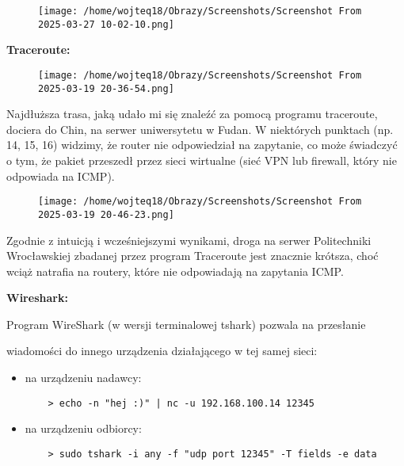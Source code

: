\documentclass[12pt]{article}
\begin{document}
\begin{figure}[H]
  \hspace{-4cm}
  \texttt{[image: /home/wojteq18/Obrazy/Screenshots/Screenshot From 2025-03-27 10-02-10.png]}
  \label{fig:large_hu_berlin}
\end{figure}


\vspace{1\baselineskip}
\textbf{Traceroute:}

\begin{figure}[H]
  \centering
  \texttt{[image: /home/wojteq18/Obrazy/Screenshots/Screenshot From 2025-03-19 20-36-54.png]}
  \label{fig:traceroute_china}
\end{figure}

Najdłuższa trasa, jaką udało mi się znaleźć za pomocą programu traceroute, dociera do Chin, na serwer uniwersytetu w Fudan. 
W niektórych punktach (np. 14, 15, 16) widzimy, że router nie odpowiedział na zapytanie, co może świadczyć o tym, że pakiet przeszedł przez sieci wirtualne
(sieć VPN lub firewall, który nie odpowiada na ICMP).

\begin{figure}[H]
  \centering
  \texttt{[image: /home/wojteq18/Obrazy/Screenshots/Screenshot From 2025-03-19 20-46-23.png]}
  \label{fig:traceroute_poland}
\end{figure}

Zgodnie z intuicją i wcześniejszymi wynikami, droga na serwer Politechniki Wrocławskiej zbadanej przez program Traceroute jest znacznie krótsza,
choć wciąż natrafia na routery, które nie odpowiadają na zapytania ICMP.

\vspace{1\baselineskip}
\textbf{Wireshark:}

Program WireShark (w wersji terminalowej tshark) pozwala na przesłanie \par wiadomości do innego urządzenia działającego w tej samej sieci:
\begin{itemize}
  \item na urządzeniu nadawcy:
  \begin{verbatim}
    > echo -n "hej :)" | nc -u 192.168.100.14 12345
  \end{verbatim}
  \item na urządzeniu odbiorcy:
  \begin{verbatim}
    > sudo tshark -i any -f "udp port 12345" -T fields -e data
  \end{verbatim}
\end{itemize}
\end{document}
